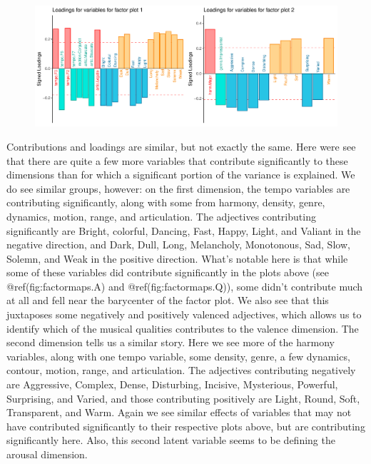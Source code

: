 \documentclass[
  english,
  man,floatsintext]{apa6}
\begin{document}
\begin{figure}

{\centering \includegraphics{Music-Descriptor-Space_files/figure-latex/loadingsplsc-1} 

}

\caption{ }\label{fig:loadingsplsc}
\end{figure}

Contributions and loadings are similar, but not exactly the same. Here were see that there are quite a few more variables that contribute significantly to these dimensions than for which a significant portion of the variance is explained. We do see similar groups, however: on the first dimension, the tempo variables are contributing significantly, along with some from harmony, density, genre, dynamics, motion, range, and articulation. The adjectives contributing significantly are Bright, colorful, Dancing, Fast, Happy, Light, and Valiant in the negative direction, and Dark, Dull, Long, Melancholy, Monotonous, Sad, Slow, Solemn, and Weak in the positive direction. What's notable here is that while some of these variables did contribute significantly in the plots above (see @ref(fig:factormaps.A) and @ref(fig:factormaps.Q)), some didn't contribute much at all and fell near the barycenter of the factor plot. We also see that this juxtaposes some negatively and positively valenced adjectives, which allows us to identify which of the musical qualities contributes to the valence dimension.
The second dimension tells us a similar story. Here we see more of the harmony variables, along with one tempo variable, some density, genre, a few dynamics, contour, motion, range, and articulation. The adjectives contributing negatively are Aggressive, Complex, Dense, Disturbing, Incisive, Mysterious, Powerful, Surprising, and Varied, and those contributing positively are Light, Round, Soft, Transparent, and Warm. Again we see similar effects of variables that may not have contributed significantly to their respective plots above, but are contributing significantly here. Also, this second latent variable seems to be defining the arousal dimension.\\
\end{document}
